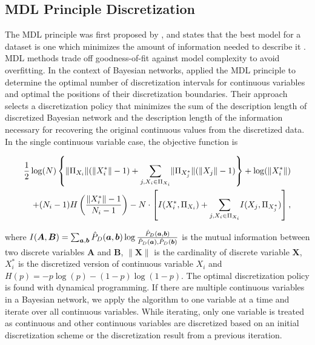 \subsection{MDL Principle Discretization}
The MDL principle was first proposed by \cite{MDL_1978}, and states that the best model for a dataset is one which minimizes the amount of information needed to describe it \citep{Grunwald_2009}. MDL methods trade off goodness-of-fit against model complexity to avoid overfitting. In the context of Bayesian networks, \cite{Friedman_1996} applied the MDL principle to determine the optimal number of discretization intervals for continuous variables and optimal the positions of their discretization boundaries. Their approach selects a discretization policy that minimizes the sum of the description length of discretized Bayesian network and the description length of the information necessary for recovering the original continuous values from the discretized data. In the single continuous variable case, the objective function is

\begin{small}
\begin{equation}
\begin{aligned}
\frac{1}{2} \log(N) \left\lbrace  \lVert \Pi_{X_i} \rVert (\lVert X^*_i \rVert - 1) +
 {\sum_{j,X_i \in \Pi_{X_i}}} \lVert \Pi_{X^*_j} \rVert (\lVert X_j \rVert - 1) \right\rbrace + \log(\lVert {X^*_i} \rVert) \\
 + (N_i-1) H \left( {{\|X^*_i\| - 1}\over{N_i -1}}  \right) -N \cdot \left[ I(X^*_i,\Pi_{X_i}) + {\sum_{j,X_i \in \Pi_{X_i}}} I(X_j, \Pi_{X^*_j}) \right],
\end{aligned}
\end{equation}
\end{small}

\noindent
where $I(\boldsymbol{A},\boldsymbol{B}) = \sum_{\boldsymbol{a},\boldsymbol{b}} \hat{P}_D (\boldsymbol{a},\boldsymbol{b}) \log {{\hat{P}_D (\boldsymbol{a},\boldsymbol{b})}\over{\hat{P}_D (\boldsymbol{a}),\hat{P}_D (\boldsymbol{b})}}$  is the mutual information between two discrete variables $\boldsymbol{A}$ and $\boldsymbol{B}$, $\|\boldsymbol{X}\|$ is the cardinality of discrete variable $\boldsymbol{X}$, $X^*_i$ is the discretized version of continuous variable $X_i$ and $H(p) = -p \log(p) - (1-p) \log(1-p)$. The optimal discretization policy is found with dynamical programming. If there are multiple continuous variables in a Bayesian network, we apply the algorithm to one variable at a time and iterate over all continuous variables. While iterating, only one variable is treated as continuous and other continuous variables are discretized based on an initial discretization scheme or the discretization result from a previous iteration.

